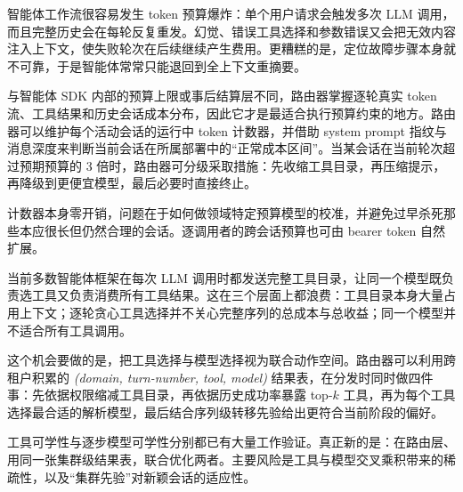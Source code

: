 \begin{opportunity}[智能体会话的运行时令牌预算约束]
\label{opp:token-budget}
智能体工作流很容易发生 token 预算爆炸：单个用户请求会触发多次 LLM 调用，而且完整历史会在每轮反复重发。幻觉、错误工具选择和参数错误又会把无效内容注入上下文，使失败轮次在后续继续产生费用。更糟糕的是，定位故障步骤本身就不可靠，于是智能体常常只能退回到全上下文重摘要。

与智能体 SDK 内部的预算上限或事后结算层不同，路由器掌握逐轮真实 token 流、工具结果和历史会话成本分布，因此它才是最适合执行预算约束的地方。路由器可以维护每个活动会话的运行中 token 计数器，并借助 system prompt 指纹与消息深度来判断当前会话在所属部署中的“正常成本区间”。当某会话在当前轮次超过预期预算的 3 倍时，路由器可分级采取措施：先收缩工具目录，再压缩提示，再降级到更便宜模型，最后必要时直接终止。

\begin{frisk}
计数器本身零开销，问题在于如何做领域特定预算模型的校准，并避免过早杀死那些本应很长但仍然合理的会话。逐调用者的跨会话预算也可由 bearer token 自然扩展。
\end{frisk}
\end{opportunity}

\begin{opportunity}
\label{opp:tool-pruning}
当前多数智能体框架在每次 LLM 调用时都发送完整工具目录，让同一个模型既负责选工具又负责消费所有工具结果。这在三个层面上都浪费：工具目录本身大量占用上下文；逐轮贪心工具选择并不关心完整序列的总成本与总收益；同一个模型并不适合所有工具调用。

这个机会要做的是，把工具选择与模型选择视为联合动作空间。路由器可以利用跨租户积累的 \emph{(domain, turn-number, tool, model)} 结果表，在分发时同时做四件事：先依据权限缩减工具目录，再依据历史成功率暴露 top-$k$ 工具，再为每个工具选择最合适的解析模型，最后结合序列级转移先验给出更符合当前阶段的偏好。

\begin{frisk}
工具可学性与逐步模型可学性分别都已有大量工作验证。真正新的是：在路由层、用同一张集群级结果表，联合优化两者。主要风险是工具与模型交叉乘积带来的稀疏性，以及“集群先验”对新颖会话的适应性。
\end{frisk}
\end{opportunity}

